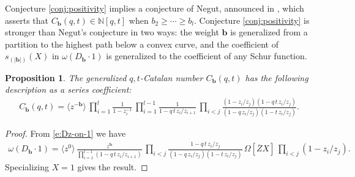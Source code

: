 \documentclass[12pt]{amsart}
\newtheorem{prop}[thm]{Proposition}
\theoremstyle{definition}
\theoremstyle{remark}
\newcommand{\NN}{{\mathbb N}}
\newcommand{\bb}{{\mathbf b}}
\begin{document}
Conjecture \ref{conj:positivity} implies a conjecture of Negut,
announced in \cite{GHRS}, which asserts that $C_{\bb }(q,t) \in \NN
[q,t]$ when $b_{2}\geq \cdots \geq b_{l}$.  Conjecture
\ref{conj:positivity} is stronger than Negut's conjecture in two ways:
the weight $\bb $ is generalized from a partition to the highest path
below a convex curve, and the coefficient of $s_{(|\bb|)}(X)$ in
$\omega (D_\bb \cdot 1)$ is generalized to the coefficient of any
Schur function.

\begin{prop}
\label{prop:C(q,t)}
The generalized $q,t$-Catalan number $C_\bb(q,t)$ has the following
description as a series coefficient:
\begin{align}
\label{e:for GHRS}
C_\bb(q,t) =
\langle z^{-\bb} \rangle
\,
\prod_{i=1}^l \frac{1}{1-z_i^{-1}} \,
\prod_{i=1}^{l-1}\frac{1}{1-q\, t\, z_{i}/z_{i+1}}
 \, \prod _{i<j} \frac{(1-z_{i}/z_{j})(1-q\, t\,
z_{i}/z_{j})}{(1-q \, z_{i}/z_{j})(1-t \, z_{i}/z_{j})} .
\end{align}
\end{prop}
\begin{proof}
From \eqref{e:Dz-on-1} we have
\begin{align*}
\label{e:Dz-on-1 v2}
\omega (D_\bb \cdot 1)
= \langle z^{0} \rangle \,
 \frac{z^{\bb }}{\prod_{i=1}^{l-1} (1-q\, t\, z_{i}/z_{i+1})} \,
 \prod _{i<j} \frac{1-q\, t\,
z_{i}/z_{j}}{(1-q \, z_{i}/z_{j})(1-t \, z_{i}/z_{j})} \,
\Omega[\overline{Z} X] \, \prod _{i<j}(1-z_{i}/z_{j}).
\end{align*}
Specializing  $X = 1$ gives the result.
\end{proof}



 
\end{document}
